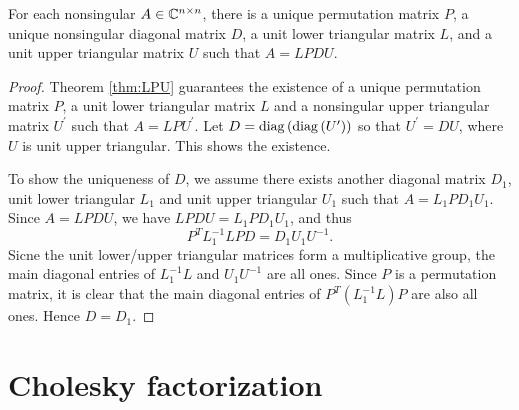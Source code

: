 \documentclass[12pt]{article}
\begin{document}
\begin{theorem}
    For each nonsingular \(A\in\mathbb C^{n\times n}\), there is a unique permutation matrix \(P\), a unique nonsingular diagonal matrix \(D\), a unit lower triangular matrix \(L\), and a unit upper triangular matrix \(U\) such that \(A=LPDU\).
\end{theorem}
\begin{proof}
    Theorem \ref{thm:LPU} guarantees the existence of a unique permutation matrix \(P\), a unit lower triangular matrix \(L\) and a nonsingular upper triangular matrix \(U^\prime\) such that \(A=LPU^\prime\). Let \(D=\operatorname{diag}\left(\operatorname{diag}\left(U^\prime\right)\right)\) so that \(U^\prime=DU\), where \(U\) is unit upper triangular. This shows the existence.\par
    To show the uniqueness of \(D\), we assume there exists another diagonal matrix \(D_1\), unit lower triangular \(L_1\) and unit upper triangular \(U_1\) such that \(A=L_1PD_1U_1\). Since \(A=LPDU\), we have \(LPDU=L_1PD_1U_1\), and thus
    \[P^TL_1^{-1}LPD=D_1U_1U^{-1}.\]
    Sicne the unit lower/upper triangular matrices form a multiplicative group, the main diagonal entries of \(L_1^{-1}L\) and \(U_1U^{-1}\) are all ones. Since \(P\) is a permutation matrix, it is clear that the main diagonal entries of \(P^T(L_1^{-1}L)P\) are also all ones. Hence \(D=D_1\).
\end{proof}

\section{Cholesky factorization}
\end{document}

